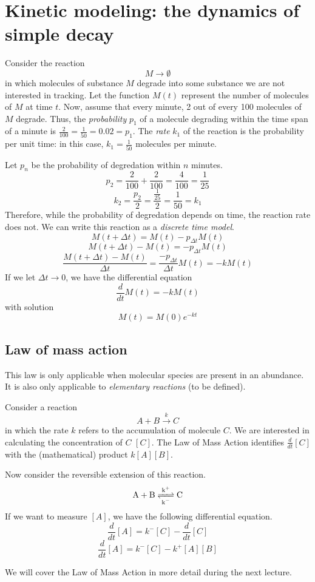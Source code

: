 \documentclass[10pt]{article}
\begin{document}
\section*{Kinetic modeling: the dynamics of simple decay}
Consider the reaction \[ M \rightarrow \emptyset \] in which molecules of substance $M$ degrade into some substance we are not interested in tracking.
Let the function $M(t)$ represent the number of molecules of $M$ at time $t$.
Now, assume that every minute, 2 out of every 100 molecules of $M$ degrade.
Thus, the \textit{probability} $p_1$ of a molecule degrading within the time span of a minute is $\frac{2}{100} = \frac{1}{50} = 0.02 = p_1$.
The \textit{rate} $k_1$ of the reaction is the probability per unit time: in this case, $k_1 = \frac{1}{50}$ molecules per minute.

Let $p_n$ be the probability of degredation within $n$ minutes.
\[ p_2 = \frac{2}{100} + \frac{2}{100} = \frac{4}{100} = \frac{1}{25} \]
\[ k_2 = \frac{p_2}{2} = \frac{\frac{1}{25}}{2} = \frac{1}{50} = k_1 \]
Therefore, while the probability of degredation depends on time, the reaction rate does not.
We can write this reaction as a \textit{discrete time model}.
\[ M(t + \Delta t) = M(t) - p_{\Delta t}M(t) \]
\[ M(t + \Delta t) - M(t) = -p_{\Delta t}M(t) \]
\[ \frac{M(t + \Delta t) - M(t)}{\Delta t} = \frac{-p_{\Delta t}}{\Delta t}M(t) = -kM(t) \]
If we let $\Delta t \rightarrow 0$, we have the differential equation \[ \frac{d}{dt}M(t) = -kM(t) \] with solution \[ M(t) = M(0)e^{-kt} \]

\subsection*{Law of mass action}
This law is only applicable when molecular species are present in an abundance.
It is also only applicable to \textit{elementary reactions} (to be defined).

Consider a reaction \[ A + B \xrightarrow{k} C \] in which the rate $k$ refers to the accumulation of molecule $C$. We are interested in calculating the concentration of $C$ $[C]$. The Law of Mass Action identifies $\frac{d}{dt}[C]$ with the (mathematical) product $k[A][B]$.

Now consider the reversible extension of this reaction.
\[ \ce{A + B <=>[k^{+}][k^{-}] C} \]
If we want to measure $[A]$, we have the following differential equation.
\[ \frac{d}{dt}[A] = k^{-}[C] -\frac{d}{dt}[C] \]
\[ \frac{d}{dt}[A] = k^{-}[C] -k^{+}[A][B] \]

We will cover the Law of Mass Action in more detail during the next lecture.
\end{document}

